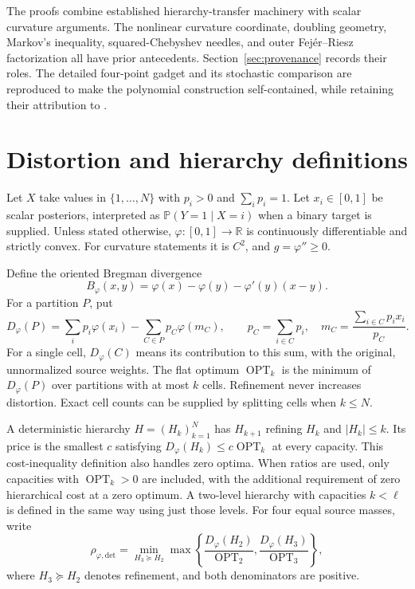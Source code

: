 \documentclass[11pt]{article}
\theoremstyle{definition}\newtheorem{definition}[theorem]{Definition}
\theoremstyle{remark}\newtheorem{remark}[theorem]{Remark}
\newcommand{\ph}{\varphi}
\newcommand{\B}{B_{\ph}}
\newcommand{\D}{D_{\ph}}
\newcommand{\OPT}{\operatorname{OPT}}
\newcommand{\R}{\mathbb R}
\newcommand{\detp}{\mathrm{det}}
\begin{document}
The proofs combine established hierarchy-transfer machinery with scalar curvature arguments. The nonlinear curvature coordinate, doubling geometry, Markov's inequality, squared-Chebyshev needles, and outer Fej\'er--Riesz factorization all have prior antecedents. Section~\ref{sec:provenance} records their roles. The detailed four-point gadget and its stochastic comparison are reproduced to make the polynomial construction self-contained, while retaining their attribution to \cite{huang7}.

\section{Distortion and hierarchy definitions}
\label{sec:definitions}
Let $X$ take values in $\{1,\ldots,N\}$ with $p_i>0$ and $\sum_i p_i=1$. Let $x_i\in[0,1]$ be scalar posteriors, interpreted as $\mathbb P(Y=1\mid X=i)$ when a binary target is supplied. Unless stated otherwise, $\ph:[0,1]\to\R$ is continuously differentiable and strictly convex. For curvature statements it is $C^2$, and $g=\ph''\ge0$.

Define the oriented Bregman divergence
\begin{equation}
\B(x,y)=\ph(x)-\ph(y)-\ph'(y)(x-y).
\label{eq:bregman}
\end{equation}
For a partition $P$, put
\begin{equation}
\D(P)=\sum_i p_i\ph(x_i)-\sum_{C\in P}p_C\ph(m_C),\qquad
p_C=\sum_{i\in C}p_i,\quad m_C=\frac{\sum_{i\in C}p_ix_i}{p_C}.
\label{eq:distortion}
\end{equation}
For a single cell, $\D(C)$ means its contribution to this sum, with the original, unnormalized source weights. The flat optimum $\OPT_k$ is the minimum of $\D(P)$ over partitions with at most $k$ cells. Refinement never increases distortion. Exact cell counts can be supplied by splitting cells when $k\le N$.

A deterministic hierarchy $H=(H_k)_{k=1}^N$ has $H_{k+1}$ refining $H_k$ and $|H_k|\le k$. Its price is the smallest $c$ satisfying $\D(H_k)\le c\OPT_k$ at every capacity. This cost-inequality definition also handles zero optima. When ratios are used, only capacities with $\OPT_k>0$ are included, with the additional requirement of zero hierarchical cost at a zero optimum. A two-level hierarchy with capacities $k<\ell$ is defined in the same way using just those levels. For four equal source masses, write
\begin{equation}
\rho_{\ph,\detp}=\min_{H_3\succeq H_2}\max\left\{
\frac{\D(H_2)}{\OPT_2},\frac{\D(H_3)}{\OPT_3}\right\},
\label{eq:detprice}
\end{equation}
where $H_3\succeq H_2$ denotes refinement, and both denominators are positive.
\end{document}
